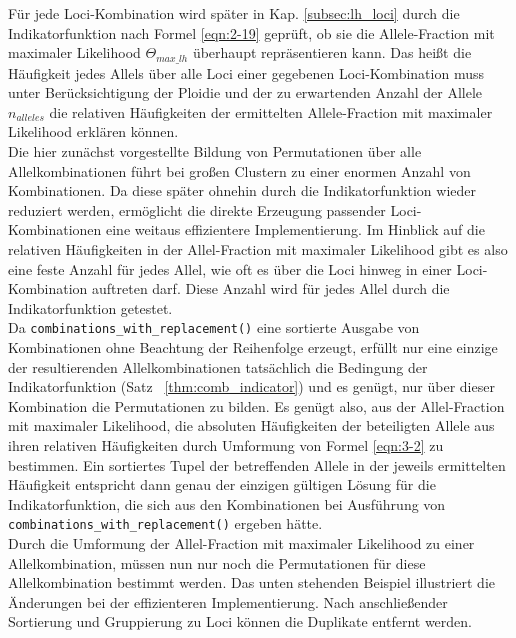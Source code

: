 Für jede Loci-Kombination wird später in Kap. \ref{subsec:lh_loci} durch die Indikatorfunktion nach Formel \eqref{eqn:2-19} geprüft, ob sie die Allele-Fraction mit maximaler Likelihood $\Theta_{max\_lh}$ überhaupt repräsentieren kann. Das heißt die Häufigkeit jedes Allels über alle Loci einer gegebenen Loci-Kombination muss unter Berücksichtigung der Ploidie und der zu erwartenden Anzahl der Allele $n_{alleles}$ die relativen Häufigkeiten der ermittelten Allele-Fraction mit maximaler Likelihood erklären können. \\

Die hier zunächst vorgestellte Bildung von Permutationen über alle Allelkombinationen führt bei großen Clustern zu einer enormen Anzahl von Kombinationen. Da diese später ohnehin durch die Indikatorfunktion wieder reduziert werden, ermöglicht die direkte Erzeugung passender Loci-Kombinationen eine weitaus effizientere Implementierung. Im Hinblick auf die relativen Häufigkeiten in der Allel-Fraction mit maximaler Likelihood gibt es also eine feste Anzahl für jedes Allel, wie oft es über die Loci hinweg in einer Loci-Kombination auftreten darf. Diese Anzahl wird für jedes Allel durch die Indikatorfunktion getestet.\\

Da \lstinline|combinations_with_replacement()| eine sortierte Ausgabe von Kombinationen ohne Beachtung der Reihenfolge erzeugt, erfüllt nur eine einzige der resultierenden Allelkombinationen tatsächlich die Bedingung der Indikatorfunktion (Satz ~\ref{thm:comb_indicator}) und es genügt, nur über dieser Kombination die Permutationen zu bilden. Es genügt also, aus der Allel-Fraction mit maximaler Likelihood, die absoluten Häufigkeiten der beteiligten Allele aus ihren relativen Häufigkeiten durch Umformung von Formel \eqref{eqn:3-2} zu bestimmen. Ein sortiertes Tupel der betreffenden Allele in der jeweils ermittelten Häufigkeit entspricht dann genau der einzigen gültigen Lösung für die Indikatorfunktion, die sich aus den Kombinationen bei Ausführung von \lstinline|combinations_with_replacement()| ergeben hätte.\\

Durch die Umformung der Allel-Fraction mit maximaler Likelihood zu einer Allelkombination, müssen nun nur noch die Permutationen für diese Allelkombination bestimmt werden. Das unten stehenden Beispiel illustriert die Änderungen bei der effizienteren Implementierung. Nach anschließender Sortierung und Gruppierung zu Loci können die Duplikate entfernt werden. \\


